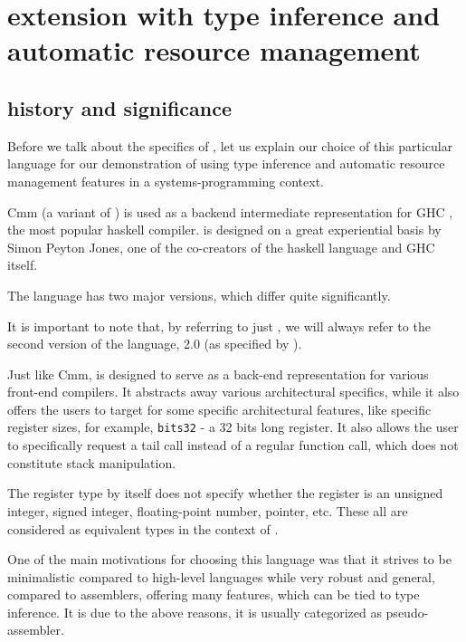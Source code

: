 \chapter{\cmm{} extension with type inference and automatic resource management}

\label{chap2}

\section{\cmm{} history and significance}

Before we talk about the specifics of \cmm{}, let us explain our choice of this particular language for our demonstration of using type inference and automatic resource management features in a systems-programming context.

Cmm (a variant of \cmm{}) is used as a backend intermediate representation for GHC \cite{haskellbackends}, the most popular haskell compiler. \cmm{} is designed on a great experiential basis by Simon Peyton Jones, one of the co-creators of the haskell language and GHC itself.

\begin{remark}
    The \cmm{} language has two major versions, which differ quite significantly.

    It is important to note that, by referring to just \cmm{}, we will always refer to the second version of the language, \cmm{} 2.0 (as specified by \citet{ramsey2005c}).
\end{remark}

Just like Cmm, \cmm{} is designed to serve as a back-end representation for various front-end compilers. It abstracts away various architectural specifics, while it also offers the users to target for some specific architectural features, like specific register sizes, for example, \lstinline{bits32} - a 32 bits long register. It also allows the user to specifically request a tail call instead of a regular function call, which does not constitute stack manipulation.

The register type by itself does not specify whether the register is an unsigned integer, signed integer, floating-point number, pointer, etc. These all are considered as equivalent types in the context of \cmm{}.

One of the main motivations for choosing this language was that it strives to be minimalistic compared to high-level languages while very robust and general, compared to assemblers, offering many features, which can be tied to type inference. It is due to the above reasons, it is usually categorized as pseudo-assembler.

